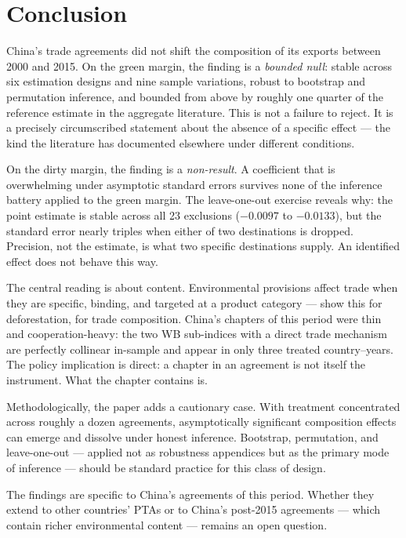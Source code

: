 \documentclass[12pt]{article}
\begin{document}
\section{Conclusion}\label{sec:conclusion}

China's trade agreements did not shift the composition of its exports between 2000 and 2015.
On the green margin, the finding is a \emph{bounded null}: stable across six estimation
designs and nine sample variations, robust to bootstrap and permutation inference, and
bounded from above by roughly one quarter of the reference estimate in the aggregate
literature. This is not a failure to reject. It is a precisely circumscribed statement
about the absence of a specific effect --- the kind the literature has documented elsewhere
under different conditions.

On the dirty margin, the finding is a \emph{non-result}. A coefficient that is overwhelming
under asymptotic standard errors survives none of the inference battery applied to the green
margin. The leave-one-out exercise reveals why: the point estimate is stable across all 23
exclusions ($-0.0097$ to $-0.0133$), but the standard error nearly triples when either of
two destinations is dropped. Precision, not the estimate, is what two specific destinations
supply. An identified effect does not behave this way.

The central reading is about content. Environmental provisions affect trade when they are
specific, binding, and targeted at a product category --- \citet{abman2024} show this for
deforestation, \citet{brandi2020} for trade composition. China's chapters of this period
were thin and cooperation-heavy: the two WB sub-indices with a direct trade mechanism are
perfectly collinear in-sample and appear in only three treated country--years. The policy
implication is direct: a chapter in an agreement is not itself the instrument. What the
chapter contains is.

Methodologically, the paper adds a cautionary case. With treatment concentrated across
roughly a dozen agreements, asymptotically significant composition effects can emerge and
dissolve under honest inference. Bootstrap, permutation, and leave-one-out --- applied not
as robustness appendices but as the primary mode of inference --- should be standard
practice for this class of design.

The findings are specific to China's agreements of this period. Whether they extend to
other countries' PTAs or to China's post-2015 agreements --- which contain richer
environmental content --- remains an open question.
\end{document}
